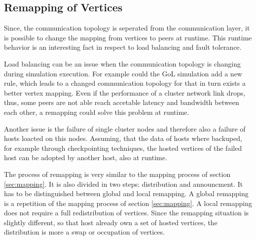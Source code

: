 \subsection{Remapping of Vertices}
\label{sec:remapping}
Since, the communication topology is seperated from the communication
layer, it is possible to change the mapping from vertices to peers at
runtime. This runtime behavior is an interesting fact in respect to
load balancing and fault tolerance.

Load balancing can be an issue when the communication topology is
changing during simulation execution. For example could the GoL
simulation add a new rule, which leads to a changed communication
topology for that in turn exists a better vertex mapping. Even if the
performance of a cluster network link drops, thus, some peers are not
able reach accetable latency and bandwidth between each other, a
remapping could solve this problem at runtime.


Another issue is the failure of single cluster nodes and therefore
also a failure of hosts loacted on this nodes. Assuming, that the data
of hosts where backuped, for example through checkpointing techniques,
the hosted vertices of the failed host can be adopted by another host,
also at runtime.

The process of remapping is very similar to the mapping process of
section \ref{sec:mapping}.  It is also divided in two steps:
distribution and announcment. It has to be distinguished between
global and local remapping. A global remapping is a repetition of the
mapping process of section \ref{sec:mapping}. A local remapping does
not require a full redistribution of vertices.  Since the remapping
situation is slightly different, so that host already own a set of
hosted vertices, the distribution is more a swap or occupation of
vertices.


\cleardoublepage

